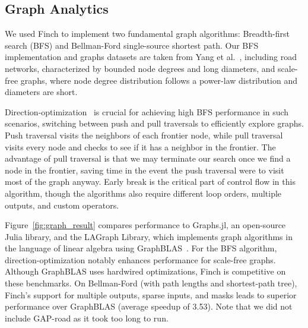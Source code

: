 \subsection{Graph Analytics}

We used Finch to implement two fundamental graph algorithms: Breadth-first search (BFS) and Bellman-Ford single-source shortest path. Our BFS implementation and graphs datasets are taken from Yang et al.~\cite{yang_implementing_2018}, including road networks, characterized by bounded node degrees and long diameters, and scale-free graphs, where node degree distribution follows a power-law distribution and diameters are short.

Direction-optimization~\cite{beamer2012direction} is crucial for achieving high BFS performance in such scenarios, switching between push and pull traversals to efficiently explore graphs. Push traversal visits the neighbors of each frontier node, while pull traversal visits every node and checks to see if it has a neighbor in the frontier. The advantage of pull traversal is that we may terminate our search once we find a node in the frontier, saving time in the event the push traversal were to visit most of the graph anyway. Early break is the critical part of control flow in this algorithm, though the algorithms also require different loop orders, multiple outputs, and custom operators.

Figure~\ref{fig:graph_result} compares performance to Graphs.jl, an open-source Julia library, and the LAGraph Library, which implements graph algorithms in the language of linear algebra using GraphBLAS~\cite{mattson2019lagraph}. For the BFS algorithm, direction-optimization notably enhances performance for scale-free graphs. Although GraphBLAS uses hardwired optimizations, Finch is competitive on these benchmarks. On Bellman-Ford (with path lengths and shortest-path tree), Finch's support for multiple outputs, sparse inputs, and masks leads to superior performance over GraphBLAS (average speedup of 3.53). Note that we did not include GAP-road as it took too long to run. %
 
